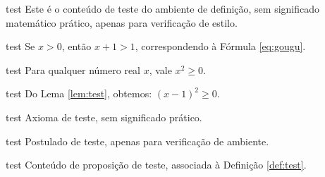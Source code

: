 \documentclass[pt]{../../elegantbook}
\begin{document}
\ifdefined\simpleTest
\begin{definition}\label{def:test}
\else
\begin{definition}{test}
\fi
Este é o conteúdo de teste do ambiente de definição, sem significado matemático prático, apenas para verificação de estilo.
\end{definition}

\ifdefined\simpleTest
\begin{theorem}\label{thm:test}
\else
\begin{theorem}{test}
\fi
Se $x>0$, então $x+1>1$, correspondendo à Fórmula \eqref{eq:gougu}.
\end{theorem}

\ifdefined\simpleTest
\begin{lemma}\label{lem:test}
\else
\begin{lemma}{test}
\fi
Para qualquer número real $x$, vale $x^2\geq0$.
\end{lemma}

\ifdefined\simpleTest
\begin{corollary}\label{cor:test}
\else
\begin{corollary}{test}
\fi
Do Lema \ref{lem:test}, obtemos: $(x-1)^2\geq0$.
\end{corollary}

\ifdefined\simpleTest
\begin{axiom}\label{axi:test}
\else
\begin{axiom}{test}
\fi
Axioma de teste, sem significado prático.
\end{axiom}

\ifdefined\simpleTest
\begin{postulate}\label{pos:test}
\else
\begin{postulate}{test}
\fi
Postulado de teste, apenas para verificação de ambiente.
\end{postulate}

\ifdefined\simpleTest
\begin{proposition}\label{pro:test}
\else
\begin{proposition}{test}
\fi
Conteúdo de proposição de teste, associada à Definição \ref{def:test}.
\end{proposition}


\end{proposition}
\end{postulate}
\end{axiom}
\end{corollary}
\end{lemma}
\end{theorem}
\end{definition}
\end{document}
